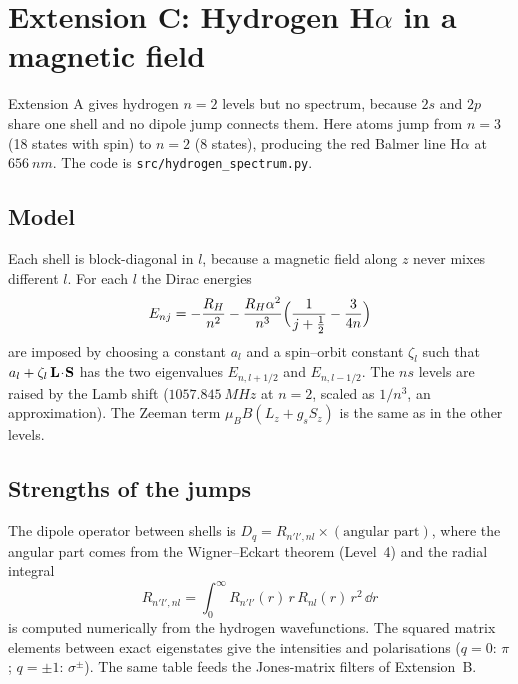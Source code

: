 \section{Extension C: Hydrogen H$\alpha$ in a magnetic field}
Extension A gives hydrogen $n=2$ levels but no spectrum, because $2s$ and $2p$ share one shell and no dipole jump connects them.
Here atoms jump from $n=3$ (18 states with spin) to $n=2$ (8 states), producing the red Balmer line H$\alpha$ at $656\ \si{nm}$.
The code is \texttt{src/hydrogen\_spectrum.py}.

\subsection{Model}
Each shell is block-diagonal in $l$, because a magnetic field along $z$ never mixes different $l$. For each $l$ the
Dirac energies
\begin{equation}
  E_{nj} = -\frac{R_H}{n^2} - \frac{R_H\alpha^2}{n^3}\Bigl(\frac{1}{j+\tfrac12}-\frac{3}{4n}\Bigr)
\end{equation}
are imposed by choosing a constant $a_l$ and a spin--orbit constant $\zeta_l$ such that $a_l+\zeta_l\,\vb{L}\!\cdot\!\vb{S}$ has the two
eigenvalues $E_{n,l+1/2}$ and $E_{n,l-1/2}$. The $ns$ levels are raised by the Lamb shift ($1057.845\ \si{MHz}$ at $n=2$, scaled as $1/n^3$,
an approximation). The Zeeman term $\mu_B B(L_z+g_sS_z)$ is the same as in the other levels.

\subsection{Strengths of the jumps}
The dipole operator between shells is $D_q = R_{n'l',nl}\times(\text{angular part})$, where the angular part comes from the Wigner--Eckart theorem
(Level~4) and the radial integral
\begin{equation}
  R_{n'l',nl}=\int_0^\infty R_{n'l'}(r)\,r\,R_{nl}(r)\,r^2\,\dd r
\end{equation}
is computed numerically from the hydrogen wavefunctions. The squared matrix elements between exact eigenstates give the intensities and
polarisations ($q=0$: $\pi$; $q=\pm1$: $\sigma^\pm$). The same table feeds the Jones-matrix filters of Extension~B.

